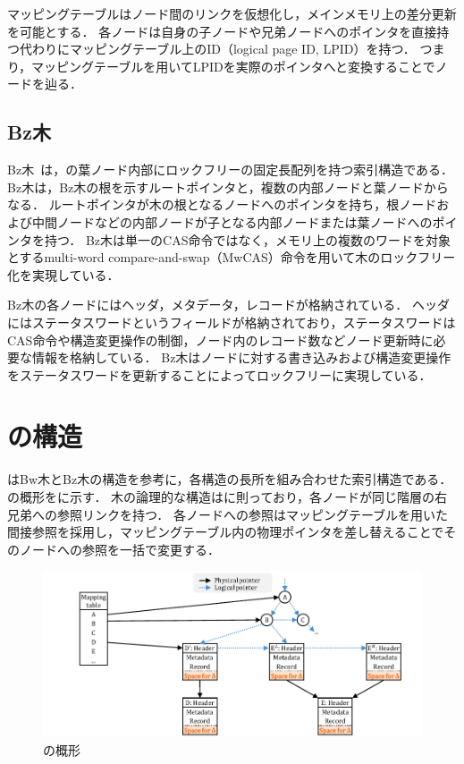 マッピングテーブルはノード間のリンクを仮想化し，メインメモリ上の差分更新を可能とする．
各ノードは自身の子ノードや兄弟ノードへのポインタを直接持つ代わりにマッピングテーブル上のID（logical page ID, LPID）を持つ．
つまり，マッピングテーブルを用いてLPIDを実際のポインタへと変換することでノードを辿る．

\subsection{Bz木}

Bz木~\cite{book:Bztree}は，\Bptree{}の葉ノード内部にロックフリーの固定長配列を持つ索引構造である．
Bz木は，Bz木の根を示すルートポインタと，複数の内部ノードと葉ノードからなる．
ルートポインタが木の根となるノードへのポインタを持ち，根ノードおよび中間ノードなどの内部ノードが子となる内部ノードまたは葉ノードへのポインタを持つ．
Bz木は単一のCAS命令ではなく，メモリ上の複数のワードを対象とするmulti-word compare-and-swap（MwCAS）命令を用いて木のロックフリー化を実現している．

Bz木の各ノードにはヘッダ，メタデータ，レコードが格納されている．
ヘッダにはステータスワードというフィールドが格納されており，ステータスワードはCAS命令や構造変更操作の制御，ノード内のレコード数などノード更新時に必要な情報を格納している．
Bz木はノードに対する書き込みおよび構造変更操作をステータスワードを更新することによってロックフリーに実現している．

\section{\Bctree{}の構造}
\label{sec:bc_tree_structure}

\Bctree{}はBw木とBz木の構造を参考に，各構造の長所を組み合わせた索引構造である．
\Bctree{}の概形を\Fig{\ref{fig:bc_tree-structure}}に示す．
木の論理的な構造は\Blinktree{}に則っており，各ノードが同じ階層の右兄弟への参照リンクを持つ．
各ノードへの参照はマッピングテーブルを用いた間接参照を採用し，マッピングテーブル内の物理ポインタを差し替えることでそのノードへの参照を一括で変更する．

\begin{figure}[t]
    \centering
    \includegraphics{./figures/Bc-structure.pdf}
    \caption{\Bctree{}の概形}
    \label{fig:bc_tree-structure}
\end{figure}

